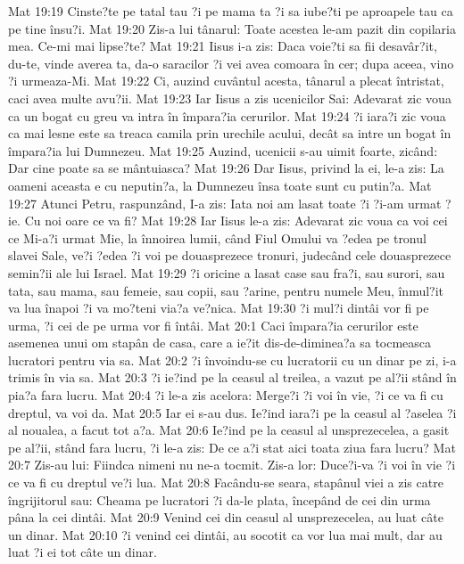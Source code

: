 Mat 19:19  Cinste?te pe tatal tau ?i pe mama ta ?i sa iube?ti pe aproapele tau ca pe tine însu?i.
Mat 19:20  Zis-a lui tânarul: Toate acestea le-am pazit din copilaria mea. Ce-mi mai lipse?te?
Mat 19:21  Iisus i-a zis: Daca voie?ti sa fii desavâr?it, du-te, vinde averea ta, da-o saracilor ?i vei avea comoara în cer; dupa aceea, vino ?i urmeaza-Mi.
Mat 19:22  Ci, auzind cuvântul acesta, tânarul a plecat întristat, caci avea multe avu?ii.
Mat 19:23  Iar Iisus a zis ucenicilor Sai: Adevarat zic voua ca un bogat cu greu va intra în împara?ia cerurilor.
Mat 19:24  ?i iara?i zic voua ca mai lesne este sa treaca camila prin urechile acului, decât sa intre un bogat în împara?ia lui Dumnezeu.
Mat 19:25  Auzind, ucenicii s-au uimit foarte, zicând: Dar cine poate sa se mântuiasca?
Mat 19:26  Dar Iisus, privind la ei, le-a zis: La oameni aceasta e cu neputin?a, la Dumnezeu însa toate sunt cu putin?a.
Mat 19:27  Atunci Petru, raspunzând, I-a zis: Iata noi am lasat toate ?i ?i-am urmat ?ie. Cu noi oare ce va fi?
Mat 19:28  Iar Iisus le-a zis: Adevarat zic voua ca voi cei ce Mi-a?i urmat Mie, la înnoirea lumii, când Fiul Omului va ?edea pe tronul slavei Sale, ve?i ?edea ?i voi pe douasprezece tronuri, judecând cele douasprezece semin?ii ale lui Israel.
Mat 19:29  ?i oricine a lasat case sau fra?i, sau surori, sau tata, sau mama, sau femeie, sau copii, sau ?arine, pentru numele Meu, înmul?it va lua înapoi ?i va mo?teni via?a ve?nica.
Mat 19:30  ?i mul?i dintâi vor fi pe urma, ?i cei de pe urma vor fi întâi.
Mat 20:1  Caci împara?ia cerurilor este asemenea unui om stapân de casa, care a ie?it dis-de-diminea?a sa tocmeasca lucratori pentru via sa.
Mat 20:2  ?i învoindu-se cu lucratorii cu un dinar pe zi, i-a trimis în via sa.
Mat 20:3  ?i ie?ind pe la ceasul al treilea, a vazut pe al?ii stând în pia?a fara lucru.
Mat 20:4  ?i le-a zis acelora: Merge?i ?i voi în vie, ?i ce va fi cu dreptul, va voi da.
Mat 20:5  Iar ei s-au dus. Ie?ind iara?i pe la ceasul al ?aselea ?i al noualea, a facut tot a?a.
Mat 20:6  Ie?ind pe la ceasul al unsprezecelea, a gasit pe al?ii, stând fara lucru, ?i le-a zis: De ce a?i stat aici toata ziua fara lucru?
Mat 20:7  Zis-au lui: Fiindca nimeni nu ne-a tocmit. Zis-a lor: Duce?i-va ?i voi în vie ?i ce va fi cu dreptul ve?i lua.
Mat 20:8  Facându-se seara, stapânul viei a zis catre îngrijitorul sau: Cheama pe lucratori ?i da-le plata, începând de cei din urma pâna la cei dintâi.
Mat 20:9  Venind cei din ceasul al unsprezecelea, au luat câte un dinar.
Mat 20:10  ?i venind cei dintâi, au socotit ca vor lua mai mult, dar au luat ?i ei tot câte un dinar.
